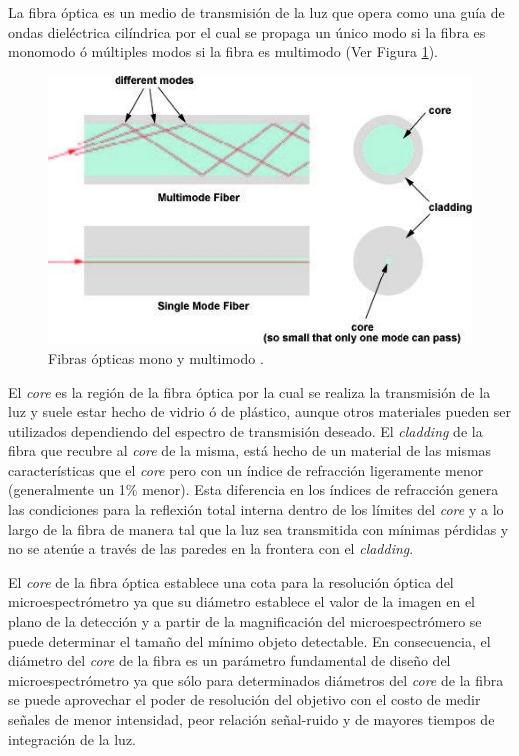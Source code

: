 La fibra óptica es un medio de transmisión de la luz que opera como una guía de ondas dieléctrica cilíndrica por el cual se propaga un único modo si la fibra es monomodo ó múltiples modos si la fibra es multimodo (Ver Figura \ref{fig:guiasmon}). 
\begin{figure}[H]
	\centering
	\includegraphics[scale=1.0]{Figs/introduccion/guias.jpg}
	\caption{Fibras ópticas mono y multimodo \cite{dintek}.}
	\label{fig:guiasmon}
\end{figure}
El \textit{core} es la región de la fibra óptica por la cual se realiza la transmisión de la luz y suele estar hecho de vidrio ó de plástico, aunque otros materiales pueden ser utilizados dependiendo del espectro de transmisión deseado. El \textit{cladding} de la fibra que recubre al \textit{core} de la misma, está hecho de un material de las mismas características que el \textit{core} pero con un índice de refracción ligeramente menor (generalmente un 1\% menor)\cite{hecht2012optics}. Esta diferencia en los índices de refracción genera las condiciones para la reflexión total interna dentro de los límites del \textit{core} y a lo largo de la fibra de manera tal que la luz sea transmitida con mínimas pérdidas y no se atenúe a través de las paredes en la frontera con el \textit{cladding}. 

El \textit{core} de la fibra óptica establece una cota para la resolución óptica del microespectrómetro ya que su diámetro establece el valor de la imagen en el plano de la detección y a partir de la magnificación del microespectrómero se puede determinar el tamaño del mínimo objeto detectable. En consecuencia, el diámetro del \textit{core} de la fibra es un parámetro fundamental de diseño del microespectrómetro ya que sólo para determinados diámetros del \textit{core} de la fibra se puede aprovechar el poder de resolución del objetivo con el costo de medir señales de menor intensidad, peor relación señal-ruido y de mayores tiempos de integración de la luz.


